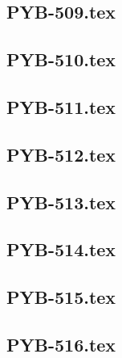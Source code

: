 \renewcommand{\xxexo}{PYB-509.tex} 
\subsection*{\xxexo} 
\graphicspath{{../../exos/python_bases/PYB-509/}}
 
 
\renewcommand{\xxexo}{PYB-510.tex} 
\subsection*{\xxexo} 
\graphicspath{{../../exos/python_bases/PYB-510/}}
 
 
\renewcommand{\xxexo}{PYB-511.tex} 
\subsection*{\xxexo} 
\graphicspath{{../../exos/python_bases/PYB-511/}}
 
 
\renewcommand{\xxexo}{PYB-512.tex} 
\subsection*{\xxexo} 
\graphicspath{{../../exos/python_bases/PYB-512/}}
 
 
\renewcommand{\xxexo}{PYB-513.tex} 
\subsection*{\xxexo} 
\graphicspath{{../../exos/python_bases/PYB-513/}}
 
 
\renewcommand{\xxexo}{PYB-514.tex} 
\subsection*{\xxexo} 
\graphicspath{{../../exos/python_bases/PYB-514/}}
 
 
\renewcommand{\xxexo}{PYB-515.tex} 
\subsection*{\xxexo} 
\graphicspath{{../../exos/python_bases/PYB-515/}}
 
 
\renewcommand{\xxexo}{PYB-516.tex} 
\subsection*{\xxexo} 
\graphicspath{{../../exos/python_bases/PYB-516/}}
 
 
